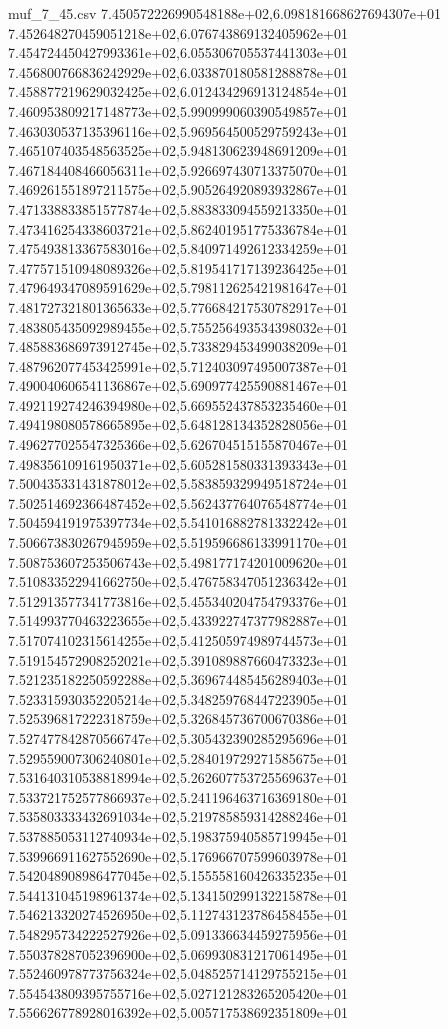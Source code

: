 \begin{filecontents*}{muf_7_45.csv}
7.450572226990548188e+02,6.098181668627694307e+01
7.452648270459051218e+02,6.076743869132405962e+01
7.454724450427993361e+02,6.055306705537441303e+01
7.456800766836242929e+02,6.033870180581288878e+01
7.458877219629032425e+02,6.012434296913124854e+01
7.460953809217148773e+02,5.990999060390549857e+01
7.463030537135396116e+02,5.969564500529759243e+01
7.465107403548563525e+02,5.948130623948691209e+01
7.467184408466056311e+02,5.926697430713375070e+01
7.469261551897211575e+02,5.905264920893932867e+01
7.471338833851577874e+02,5.883833094559213350e+01
7.473416254338603721e+02,5.862401951775336784e+01
7.475493813367583016e+02,5.840971492612334259e+01
7.477571510948089326e+02,5.819541717139236425e+01
7.479649347089591629e+02,5.798112625421981647e+01
7.481727321801365633e+02,5.776684217530782917e+01
7.483805435092989455e+02,5.755256493534398032e+01
7.485883686973912745e+02,5.733829453499038209e+01
7.487962077453425991e+02,5.712403097495007387e+01
7.490040606541136867e+02,5.690977425590881467e+01
7.492119274246394980e+02,5.669552437853235460e+01
7.494198080578665895e+02,5.648128134352828056e+01
7.496277025547325366e+02,5.626704515155870467e+01
7.498356109161950371e+02,5.605281580331393343e+01
7.500435331431878012e+02,5.583859329949518724e+01
7.502514692366487452e+02,5.562437764076548774e+01
7.504594191975397734e+02,5.541016882781332242e+01
7.506673830267945959e+02,5.519596686133991170e+01
7.508753607253506743e+02,5.498177174201009620e+01
7.510833522941662750e+02,5.476758347051236342e+01
7.512913577341773816e+02,5.455340204754793376e+01
7.514993770463223655e+02,5.433922747377982887e+01
7.517074102315614255e+02,5.412505974989744573e+01
7.519154572908252021e+02,5.391089887660473323e+01
7.521235182250592288e+02,5.369674485456289403e+01
7.523315930352205214e+02,5.348259768447223905e+01
7.525396817222318759e+02,5.326845736700670386e+01
7.527477842870566747e+02,5.305432390285295696e+01
7.529559007306240801e+02,5.284019729271585675e+01
7.531640310538818994e+02,5.262607753725569637e+01
7.533721752577866937e+02,5.241196463716369180e+01
7.535803333432691034e+02,5.219785859314288246e+01
7.537885053112740934e+02,5.198375940585719945e+01
7.539966911627552690e+02,5.176966707599603978e+01
7.542048908986477045e+02,5.155558160426335235e+01
7.544131045198961374e+02,5.134150299132215878e+01
7.546213320274526950e+02,5.112743123786458455e+01
7.548295734222527926e+02,5.091336634459275956e+01
7.550378287052396900e+02,5.069930831217061495e+01
7.552460978773756324e+02,5.048525714129755215e+01
7.554543809395755716e+02,5.027121283265205420e+01
7.556626778928016392e+02,5.005717538692351809e+01

\end{filecontents*}
